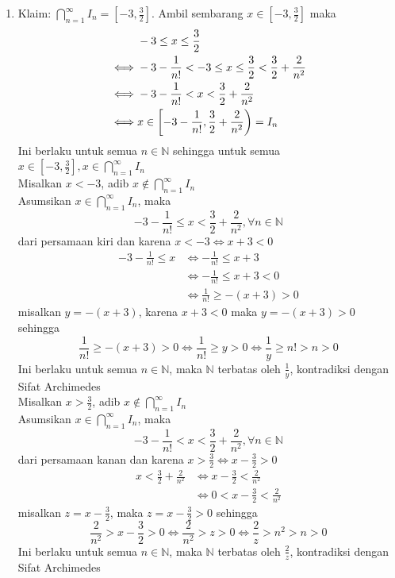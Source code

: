 \documentclass{article}
\begin{document}
\begin{enumerate}[leftmargin=*, label={\arabic*}.]
\item Klaim: $\bigcap_{n=1}^{\infty}I_n = [-3,\frac{3}{2}]$.
Ambil sembarang $x \in [-3,\frac{3}{2}]$ maka
\begin{align*}
    &-3 \leq x \leq \frac{3}{2}\\
    \iff&-3-\frac{1}{n!} < -3 \leq x \leq \frac{3}{2} < \frac{3}{2}+\frac{2}{n^2}\\
    \iff&-3-\frac{1}{n!} < x < \frac{3}{2}+\frac{2}{n^2}\\
    \iff&x \in \cio*{-3-\frac{1}{n!},\frac{3}{2}+\frac{2}{n^2}} = I_n
\end{align*}
Ini berlaku untuk semua $n\in \mathbb{N}$ sehingga untuk semua $x\in [-3,\frac{3}{2}], x\in\bigcap_{n=1}^{\infty}I_n$\\
Misalkan $x < -3$, adib $x\notin \bigcap_{n=1}^{\infty}I_n$\\
Asumsikan $x \in \bigcap_{n=1}^{\infty}I_n$, maka\\
\[-3-\frac{1}{n!} \leq x < \frac{3}{2}+\frac{2}{n^2}, \forall n \in \mathbb{N}\] 
dari persamaan kiri dan karena $x < - 3 \iff x+3 < 0$
\begin{align*}
    -3-\frac{1}{n!} \leq x &\iff -\frac{1}{n!} \leq x+3\\
    &\iff  -\frac{1}{n!} \leq x+3 < 0\\
    &\iff \frac{1}{n!} \geq -(x+3) > 0
\end{align*}
misalkan $y = -(x+3)$, karena $x+3 < 0$ maka $y = -(x+3) > 0$ sehingga
\[
    \frac{1}{n!} \geq -(x+3) > 0 \iff \frac{1}{n!} \geq y > 0 \iff \frac{1}{y} \geq n! > n > 0
\]
Ini berlaku untuk semua $n\in \mathbb{N}$, maka $\mathbb{N}$ terbatas oleh $\frac{1}{y}$, kontradiksi dengan Sifat Archimedes\\
Misalkan $x > \frac{3}{2}$, adib $x\notin \bigcap_{n=1}^{\infty}I_n$\\
Asumsikan $x \in \bigcap_{n=1}^{\infty}I_n$, maka\\
\[-3-\frac{1}{n!} < x < \frac{3}{2}+\frac{2}{n^2}, \forall n \in \mathbb{N}\] 
dari persamaan kanan dan karena $x > \frac{3}{2} \iff x-\frac{3}{2} > 0$
\begin{align*}
    x < \frac{3}{2}+\frac{2}{n^2} &\iff x - \frac{3}{2} < \frac{2}{n^2}\\
    &\iff  0 < x - \frac{3}{2} < \frac{2}{n^2}
\end{align*}
misalkan $z = x - \frac{3}{2}$, maka $z = x - \frac{3}{2} > 0$ sehingga
\[
    \frac{2}{n^2} > x - \frac{3}{2} > 0 \iff \frac{2}{n^2} > z > 0 \iff \frac{2}{z} > n^2 > n > 0
\]
Ini berlaku untuk semua $n\in \mathbb{N}$, maka $\mathbb{N}$ terbatas oleh $\frac{2}{z}$, kontradiksi dengan Sifat Archimedes\\

\end{enumerate}
\end{document}
